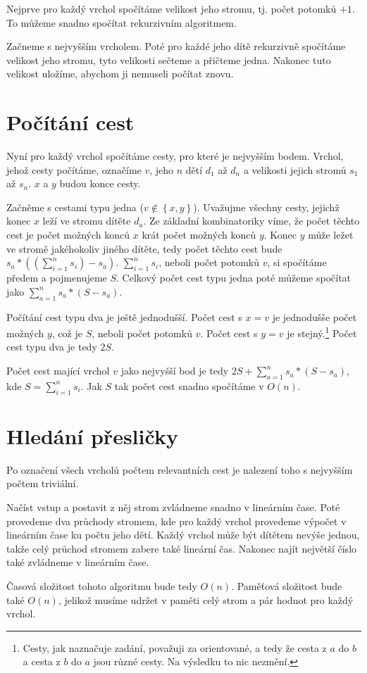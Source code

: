 \documentclass{article}
\begin{document}
Nejprve pro každý vrchol spočítáme velikost jeho stromu, tj. počet potomků $+1$. To můžeme snadno spočítat rekurzivním algoritmem.

Začneme s nejvyšším vrcholem. Poté pro každé jeho dítě rekurzivně spočítáme velikost jeho stromu, tyto velikosti sečteme a přičteme jedna. Nakonec tuto velikost uložíme, abychom ji nemuseli počítat znovu.

\section{Počítání cest}

Nyní pro každý vrchol spočítáme cesty, pro které je nejvyšším bodem. Vrchol, jehož cesty počítáme, označíme $v$, jeho $n$ dětí $d_1$ až $d_n$ a velikosti jejich stromů $s_1$ až $s_n$. $x$ a $y$ budou konce cesty.

Začněme s cestami typu jedna ($v \notin \left\{x, y\right\}$). Uvažujme všechny cesty, jejichž konec $x$ leží ve stromu dítěte $d_a$. Ze základní kombinatoriky víme, že počet těchto cest je počet možných konců $x$ krát počet možných konců $y$. Konec $y$ může ležet ve stromě jakéhokoliv jiného dítěte, tedy počet těchto cest bude $s_a * \left(\left(\sum_{i=1}^{n} s_i\right) - s_a\right)$. $\sum_{i=1}^{n} s_i$, neboli počet potomků $v$, si spočítáme předem a pojmenujeme $S$. Celkový počet cest typu jedna poté můžeme spočítat jako $\sum_{a=1}^{n} s_a * \left(S - s_a\right)$.

Počítání cest typu dva je ještě jednodušší. Počet cest s $x = v$ je jednodušše počet možných $y$, což je $S$, neboli počet potomků $v$. Počet cest s $y = v$ je stejný.\footnote{Cesty, jak naznačuje zadání, považuji za orientované, a tedy že cesta z $a$ do $b$ a cesta z $b$ do $a$ jsou různé cesty. Na výsledku to nic nezmění.} Počet cest typu dva je tedy $2S$.

Počet cest mající vrchol $v$ jako nejvyšší bod je tedy $2S + \sum_{a=1}^{n} s_a * \left(S - s_a\right)$, kde $S = \sum_{i=1}^{n} s_i$. Jak $S$ tak počet cest snadno spočítáme v $O(n)$.

\section{Hledání přesličky}

Po označení všech vrcholů počtem relevantních cest je nalezení toho s nejvyšším počtem triviální.

Načíst vstup a postavit z něj strom zvládneme snadno v lineárním čase. Poté provedeme dva průchody stromem, kde pro každý vrchol provedeme výpočet v lineárním čase ku počtu jeho dětí. Každý vrchol může být dítětem nevýše jednou, takže celý průchod stromem zabere také lineární čas. Nakonec najít největší číslo také zvládneme v lineárním čase.

Časová složitost tohoto algoritmu bude tedy $O(n)$. Paměťová složitost bude také $O(n)$, jelikož musíme udržet v paměti celý strom a pár hodnot pro každý vrchol.
\end{document}
